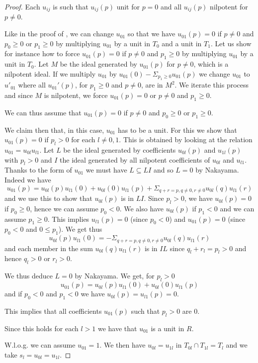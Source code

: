 \begin{proof}
  Each $u_{ij}$ is such that $u_{ij}(p)$ unit for $p=0$ and
  all $u_{ij}(p)$ nilpotent for $p\neq 0$.

  Like in the proof of , we can change $u_{01}$ so that
  we have $u_{01}(p) = 0$ if $p\neq 0$ and $p_0\geqslant 0$ or $p_1\geqslant 0$ by multiplying $u_{01}$ by a unit in $T_0$ and
  a unit in $T_1$. Let us show for instance how to force $u_{01}(p) = 0$ if $p\neq 0$ and $p_1\geqslant 0$ by multiplying $u_{01}$
  by a unit in $T_0$. Let $M$ be the ideal generated by $u_{01}(p)$ for $p\neq 0$, which is a nilpotent ideal. If we
  multiply $u_{01}$ by $u_{01}(0) - \Sigma_{p_1\geqslant 0} u_{01}(p)$
  we change $u_{01}$ to $u'_{01}$ where all $u_{01}'(p)$, for $p_1\geqslant 0$ and $p\neq 0$, are in $M^2$. We iterate this process
  and since $M$ is nilpotent, we force $u_{01}(p) = 0$ or $p\neq 0$ and $p_1\geqslant 0$.

  We can thus assume that $u_{01}(p) = 0$ if $p\neq 0$ and $p_0\geqslant 0$ or $p_1\geqslant 0$.
  
  We claim then that, in this case, $u_{01}$ has to be a unit. For this we show that $u_{01}(p) = 0$
  if $p_l>0$ for each $l\neq 0,1$. 
  This is obtained by looking at the relation $u_{01}= u_{0l}u_{l1}$. Let $L$ be the ideal generated by
  coefficients $u_{0l}(p)$ and $u_{1l}(p)$ with $p_l>0$ and $I$
  the ideal generated by all nilpotent coefficients of $u_{0l}$ and $u_{l1}$.
  Thanks to the form of $u_{01}$ we must have $L\subseteq LI$ and so $L=0$ by Nakayama. Indeed we have
  $$u_{01}(p) = u_{0l}(p)u_{l1}(0) + u_{0l}(0)u_{l1}(p) + \Sigma_{q+r = p, q\neq 0, r\neq 0}u_{0l}(q)u_{l1}(r)$$
  and we use this to show that $u_{0l}(p)$ is in $LI$.
  Since $p_l>0$, we have $u_{0l}(p) = 0$ if $p_0\geqslant 0$, hence we can assume $p_0<0$.
  We also have $u_{0l}(p)$ if $p_1<0$ and we can assume $p_1\geqslant 0$.
  This implies $u_{l1}(p) = 0$ (since $p_0<0$) and $u_{01}(p) = 0$ (since $p_0<0$ and $0\leqslant p_1$).
  We get thus
  $$u_{0l}(p)u_{l1}(0) = - \Sigma_{q+r = p, q\neq 0, r\neq 0}u_{0l}(q)u_{l1}(r)$$
  and each member in the sum $u_{0l}(q)u_{l1}(r)$ is in $IL$ since $q_l+r_l = p_l>0$ and hence $q_l>0$ or $r_l>0$.

  We thus deduce $L=0$ by Nakayama. We get, for $p_l>0$
  $$u_{01}(p) = u_{0l}(p)u_{l1}(0) + u_{0l}(0)u_{l1}(p)$$
  and if $p_0<0$ and $p_1<0$ we have $u_{0l}(p) = u_{l1}(p) = 0$.

  This implies that all coefficients $u_{01}(p)$ such that $p_l>0$ are $0$.

  Since this holds for each $l>1$ we have that $u_{01}$ is a unit in $R$.

  W.l.o.g. we can assume $u_{01}= 1$. We then have $u_{0l} = u_{1l}$ in $T_{0l}\cap T_{1l} = T_l$
  and we take $s_l = u_{0l} = u_{1l}$.
\end{proof}

